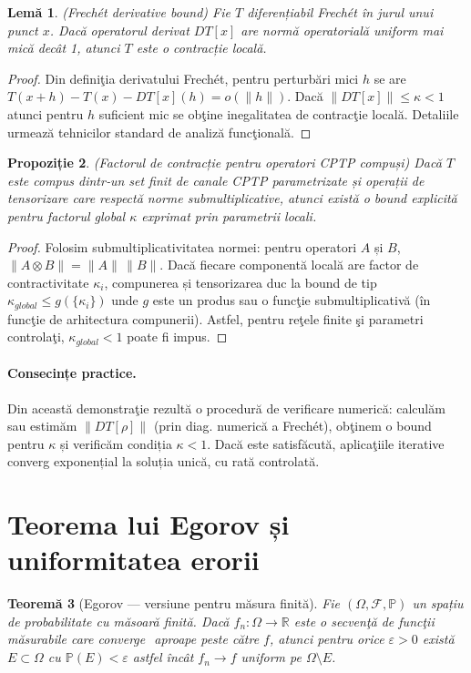 \documentclass[12pt,a4paper]{report}
\newtheorem{theorem}{Teoremă}[chapter]
\newtheorem{lemma}[theorem]{Lemă}
\newtheorem{proposition}[theorem]{Propoziție}
\theoremstyle{definition}
\theoremstyle{remark}
\begin{document}
\begin{lemma}
(Frechét derivative bound) Fie $T$ diferențiabil Frechét în jurul unui punct $x$. Dacă operatorul derivat $DT[x]$ are normă operatorială uniform mai mică decât 1, atunci $T$ este o contracție locală.
\end{lemma}

\begin{proof}
Din definiţia derivatului Frechét, pentru perturbări mici $h$ se are $T(x+h)-T(x)-DT[x](h)=o(\|h\|)$. Dacă $\|DT[x]\|\le\kappa<1$ atunci pentru $h$ suficient mic se obţine inegalitatea de contracţie locală. Detaliile urmează tehnicilor standard de analiză funcţională.
\end{proof}

\begin{proposition}
(Factorul de contracție pentru operatori CPTP compuși) Dacă $T$ este compus dintr‑un set finit de canale CPTP parametrizate și operații de tensorizare care respectă norme submultiplicative, atunci există o bound explicită pentru factorul global $\kappa$ exprimat prin parametrii locali.
\end{proposition}

\begin{proof}
Folosim submultiplicativitatea normei: pentru operatori $A$ și $B$, $\|A\otimes B\|=\|A\|\,\|B\|$. Dacă fiecare componentă locală are factor de contractivitate $\kappa_i$, compunerea și tensorizarea duc la bound de tip $\kappa_{global}\le g(\{\kappa_i\})$ unde $g$ este un produs sau o funcţie submultiplicativă (în funcţie de arhitectura compunerii). Astfel, pentru reţele finite şi parametri controlaţi, $\kappa_{global}<1$ poate fi impus.
\end{proof}

\paragraph{Consecințe practice.}
Din această demonstraţie rezultă o procedură de verificare numerică: calculăm sau estimăm $\|DT[\rho]\|$ (prin diag. numerică a Frechét), obţinem o bound pentru $\kappa$ și verificăm condiția $\kappa<1$. Dacă este satisfăcută, aplicaţiile iterative converg exponențial la soluția unică, cu rată controlată.

\section{Teorema lui Egorov și uniformitatea erorii}

\begin{theorem}[Egorov — versiune pentru măsura finită]
Fie $(\Omega,\mathcal{F},\mathbb{P})$ un spațiu de probabilitate cu măsoară finită. Dacă $f_n:\Omega\to\mathbb{R}$ este o secvenţă de funcţii măsurabile care converge $
$ aproape peste \Omega către $f$, atunci pentru orice $\varepsilon>0$ există $E\subset\Omega$ cu $\mathbb{P}(E)<\varepsilon$ astfel încât $f_n\to f$ uniform pe $\Omega\setminus E$.
\end{theorem}
\end{document}
